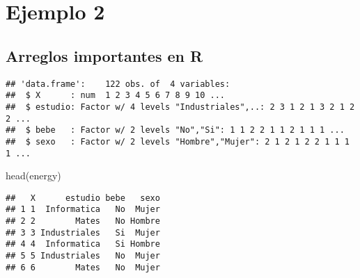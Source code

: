 \documentclass[
]{article}
\newenvironment{Shaded}{\begin{snugshade}}{\end{snugshade}}
\newcommand{\AttributeTok}[1]{\textcolor[rgb]{0.77,0.63,0.00}{#1}}
\newcommand{\CommentTok}[1]{\textcolor[rgb]{0.56,0.35,0.01}{\textit{#1}}}
\newcommand{\ConstantTok}[1]{\textcolor[rgb]{0.00,0.00,0.00}{#1}}
\newcommand{\FunctionTok}[1]{\textcolor[rgb]{0.00,0.00,0.00}{#1}}
\newcommand{\NormalTok}[1]{#1}
\newcommand{\OtherTok}[1]{\textcolor[rgb]{0.56,0.35,0.01}{#1}}
\newcommand{\SpecialCharTok}[1]{\textcolor[rgb]{0.00,0.00,0.00}{#1}}
\newcommand{\StringTok}[1]{\textcolor[rgb]{0.31,0.60,0.02}{#1}}
\begin{document}
\hypertarget{ejemplo-2}{%
\section{Ejemplo 2}\label{ejemplo-2}}

\hypertarget{arreglos-importantes-en-r}{%
\subsection{Arreglos importantes en R}\label{arreglos-importantes-en-r}}

\begin{Shaded}
\end{Shaded}

\begin{verbatim}
## 'data.frame':    122 obs. of  4 variables:
##  $ X      : num  1 2 3 4 5 6 7 8 9 10 ...
##  $ estudio: Factor w/ 4 levels "Industriales",..: 2 3 1 2 1 3 2 1 2 2 ...
##  $ bebe   : Factor w/ 2 levels "No","Si": 1 1 2 2 1 1 2 1 1 1 ...
##  $ sexo   : Factor w/ 2 levels "Hombre","Mujer": 2 1 2 1 2 2 1 1 1 1 ...
\end{verbatim}

\begin{Shaded}
\begin{Highlighting}[]
\FunctionTok{head}\NormalTok{(energy)}
\end{Highlighting}
\end{Shaded}

\begin{verbatim}
##   X      estudio bebe   sexo
## 1 1  Informatica   No  Mujer
## 2 2        Mates   No Hombre
## 3 3 Industriales   Si  Mujer
## 4 4  Informatica   Si Hombre
## 5 5 Industriales   No  Mujer
## 6 6        Mates   No  Mujer
\end{verbatim}
\end{document}
